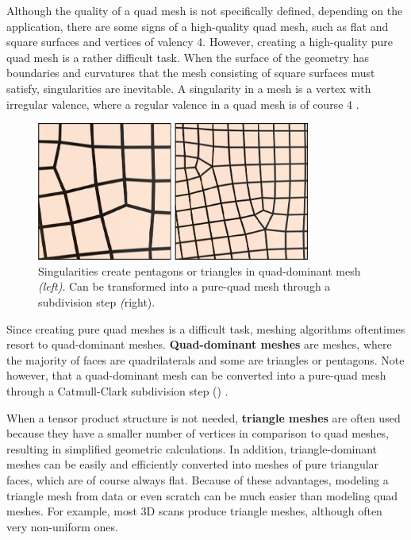 \documentclass{ACGSeminar}
\begin{document}
Although the quality of a quad mesh is not specifically defined, depending on the application, there are some signs of a high-quality quad mesh, such as flat and square surfaces and vertices of valency 4. However, creating a high-quality pure quad mesh is a rather difficult task. When the surface of the geometry has boundaries and curvatures that the mesh consisting of square surfaces must satisfy, singularities are inevitable. A singularity in a mesh is a vertex with irregular valence, where a regular valence in a quad mesh is of course 4 \cite{fogg2017simple,fogg2018singularities}.

\begin{figure}[htb!]
	\begin{centering}
		\includegraphics[width=9cm]{img/Singularities.png}\par
	\end{centering}
	\caption{Singularities create pentagons or triangles in quad-dominant mesh \textit{(left)}. Can be transformed into a pure-quad mesh through a subdivision step \textit(right). \cite{jakob2015instant}}
	\label{fig:singularities}
\end{figure}

Since creating pure quad meshes is a difficult task, meshing algorithms oftentimes resort to quad-dominant meshes. \textbf{Quad-dominant meshes} are meshes, where the majority of faces are quadrilaterals and some are triangles or pentagons. Note however, that a quad-dominant mesh can be converted into a pure-quad mesh through a Catmull-Clark subdivision step (\cite{catmull1978recursively}) \cite{jakob2015instant}.\bigskip

When a tensor product structure is not needed, \textbf{triangle meshes} are often used because they have a smaller number of vertices in comparison to quad meshes, resulting in simplified geometric calculations. In addition, triangle-dominant meshes can be easily and efficiently converted into meshes of pure triangular faces, which are of course always flat. Because of these advantages, modeling a triangle mesh from data or even scratch can be much easier than modeling quad meshes. For example, most 3D scans produce triangle meshes, although often very non-uniform ones.\bigskip
\end{document}
